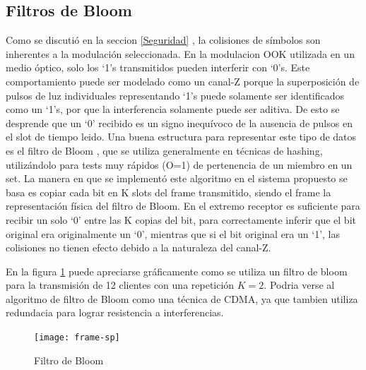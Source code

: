 \subsection{Filtros de Bloom}
\label{bloomf}
Como se discutió en la seccion \ref{Seguridad} , la colisiones de símbolos son inherentes a la modulación seleccionada.
En la modulacion OOK utilizada en un medio óptico, solo los ‘1’s transmitidos pueden interferir con ‘0’s. Este comportamiento puede ser modelado como un canal-Z porque la superposición de pulsos de luz individuales representando ‘1’s puede solamente ser identificados como un ‘1’s, por que la interferencia solamente puede ser aditiva. De esto se desprende que un ‘0’ recibido es un signo inequívoco de la ausencia de pulsos en el slot de tiempo leido.
Una buena estructura para representar este tipo de datos es el filtro de Bloom \cite{Bloom70space/timetrade-offs}, que se utiliza generalmente en técnicas de hashing, utilizándolo para tests muy rápidos (O=1) de pertenencia de un miembro en un set.
La manera en que se implementó este algoritmo en el sistema propuesto se basa es copiar cada bit en K slots del frame transmitido, siendo el frame la representación física del filtro de Bloom.
En el extremo receptor es suficiente para recibir un solo ‘0’ entre las K copias del bit, para correctamente inferir que el bit original era originalmente un ‘0’, mientras que si el bit original era un ‘1’, las colisiones no tienen efecto debido a la naturaleza del canal-Z.

En la figura \ref{fig:bloomf} puede apreciarse gráficamente como se utiliza un filtro de bloom para la transmisión de 12 clientes con una repetición $K=2$. Podria verse al algoritmo de filtro de Bloom como una técnica de CDMA, ya que tambien utiliza redundacia para lograr resistencia a interferencias.

\begin{figure}[th]
  \begin{center}
    \texttt{[image: frame-sp]}
  \end{center}
  \caption{Filtro de Bloom}
  \label{fig:bloomf}
\end{figure}


